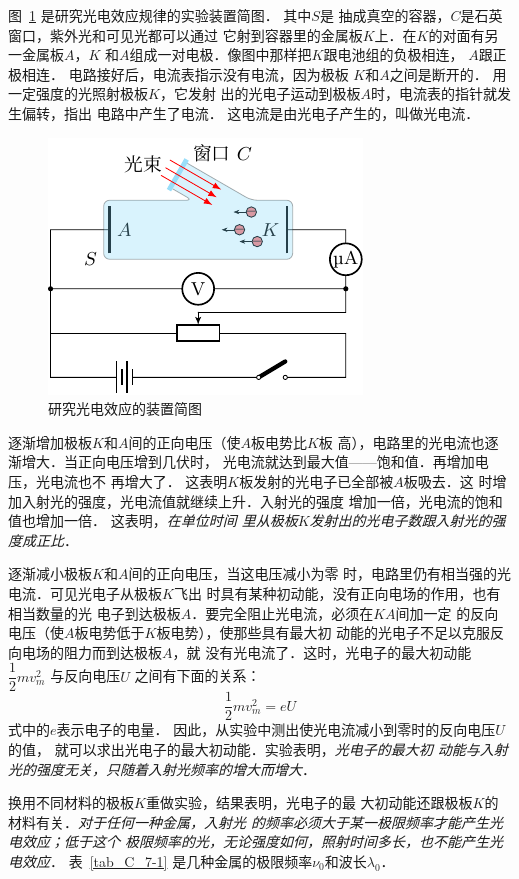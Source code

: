 图~\ref{fig_C_7-2} 是研究光电效应规律的实验装置简图．
其中$S$是
抽成真空的容器，$C$是石英窗口，紫外光和可见光都可以通过
它射到容器里的金属板$K$上．在$K$的对面有另一金属板$A$，$K$
和$A$组成一对电极．像图中那样把$K$跟电池组的负极相连，
$A$跟正极相连．
电路接好后，电流表指示没有电流，因为极板
$K$和$A$之间是断开的．
用一定强度的光照射极板$K$，它发射
出的光电子运动到极板$A$时，电流表的指针就发生偏转，指出
电路中产生了电流．
这电流是由光电子产生的，叫做光电流．
\begin{figure}[htbp]
	\centering
	\includegraphics{fig/C/7-2.pdf}
	\caption{研究光电效应的装置简图}\label{fig_C_7-2}
\end{figure}



逐渐增加极板$K$和$A$间的正向电压（使$A$板电势比$K$板
高），电路里的光电流也逐渐增大．当正向电压增到几伏时，
光电流就达到最大值——饱和值．再增加电压，光电流也不
再增大了．
这表明$K$板发射的光电子已全部被$A$板吸去．这
时增加入射光的强度，光电流值就继续上升．入射光的强度
增加一倍，光电流的饱和值也增加一倍．
这表明，\textit{在单位时间
里从极板$K$发射出的光电子数跟入射光的强度成正比}．

逐渐减小极板$K$和$A$间的正向电压，当这电压减小为零
时，电路里仍有相当强的光电流．可见光电子从极板$K$飞出
时具有某种初动能，没有正向电场的作用，也有相当数量的光
电子到达极板$A$．要完全阻止光电流，必须在$KA$间加一定
的反向电压（使$A$板电势低于$K$板电势），使那些具有最大初
动能的光电子不足以克服反向电场的阻力而到达极板$A$，就
没有光电流了．这时，光电子的最大初动能
$\dfrac{1}{2}mv^2_m$
与反向电压$U$
之间有下面的关系：
\[\dfrac{1}{2}mv^2_m=eU \]
式中的$e$表示电子的电量．
因此，从实验中测出使光电流减小到零时的反向电压$U$的值，
就可以求出光电子的最大初动能．实验表明，\textit{光电子的最大初
动能与入射光的强度无关，只随着入射光频率的增大而增大}．

换用不同材料的极板$K$重做实验，结果表明，光电子的最
大初动能还跟极板$K$的材料有关．\textit{对于任何一种金属，入射光
的频率必须大于某一极限频率才能产生光电效应；低于这个
极限频率的光，无论强度如何，照射时间多长，也不能产生光
电效应}．
表~\ref{tab_C_7-1} 是几种金属的极限频率$\nu_0$和波长$\lambda_0$．

